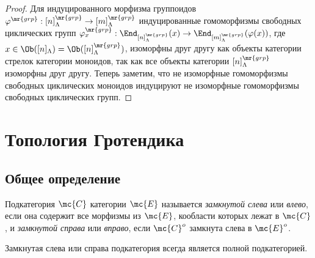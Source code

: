 \documentclass[
	extrafontsizes,
	11pt,
	hyphens,
]{memoir}
\begin{document}
\begin{proof}
Для индуцированного морфизма группоидов
\(\varphi^\mr{grp} : [n]_\Lambda^\mr{grp} \to [m]_\Lambda^\mr{grp}\)
индуцированные гомоморфизмы свободных циклических групп
\(\varphi_x^\mr{grp} : \End_{[n]_\Lambda^\mr{grp}}(x) \to \End_{[m]_\Lambda^\mr{grp}}(\varphi(x))\),
где \(x \in \Ob([n]_\Lambda) = \Ob([n]_\Lambda^\mr{grp})\),
изоморфны друг другу как объекты категории стрелок категории моноидов, так как все объекты категории \([n]_\Lambda^\mr{grp}\) изоморфны друг другу.
Теперь заметим, что не изоморфные гомоморфизмы свободных циклических моноидов индуцируют не изоморфные гомоморфизмы свободных циклических групп.
\end{proof}


\section{Топология Гротендика}

\subsection{Общее определение}

\begin{definition}
Подкатегория \(\mc{C}\) категории \(\mc{E}\) называется \emph{замкнутой слева} или \emph{влево}, если она содержит все морфизмы из \(\mc{E}\), кообласти которых лежат в \(\mc{C}\),
и \emph{замкнутой справа} или \emph{вправо}, если \(\mc{C}^o\) замкнута слева в \(\mc{E}^o\).
\end{definition}


\begin{observation}
Замкнутая слева или справа подкатегория всегда является полной подкатегорией.
\end{observation}

\end{document}
